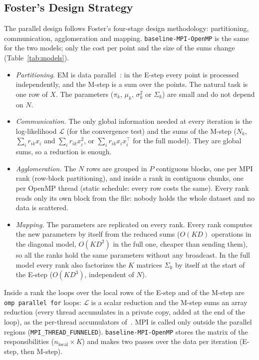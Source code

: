 \documentclass[conference,onecolumn]{IEEEtran}
\newcommand{\vbase}{\texttt{baseline-\allowbreak MPI-\allowbreak OpenMP}}
\begin{document}
\subsection{Foster's Design Strategy}
The parallel design follows Foster's four-stage design methodology: partitioning, communication, agglomeration and mapping. \vbase{} is the same for the two models; only the cost per point and the size of the sums change (Table~\ref{tab:models}).
\begin{itemize}
\item \emph{Partitioning.} EM is data parallel~\cite{sanderson,lee2020,kwedlo}: in the E-step every point is processed independently, and the M-step is a sum over the points. The natural task is one row of $X$. The parameters ($\pi_k$, $\mu_k$, $\sigma^2_k$ or $\Sigma_k$) are small and do not depend on $N$.
\item \emph{Communication.} The only global information needed at every iteration is the log-likelihood $\mathcal{L}$ (for the convergence test) and the sums of the M-step ($N_k$, $\sum_i r_{ik}x_i$ and $\sum_i r_{ik}x_i^2$, or $\sum_i r_{ik}x_ix_i^\top$ for the full model). They are global sums, so a reduction is enough.
\item \emph{Agglomeration.} The $N$ rows are grouped in $P$ contiguous blocks, one per MPI rank (row-block partitioning), and inside a rank in contiguous chunks, one per OpenMP thread (static schedule: every row costs the same). Every rank reads only its own block from the file: nobody holds the whole dataset and no data is scattered.
\item \emph{Mapping.} The parameters are replicated on every rank. Every rank computes the new parameters by itself from the reduced sums ($O(KD)$ operations in the diagonal model, $O(KD^2)$ in the full one, cheaper than sending them), so all the ranks hold the same parameters without any broadcast. In the full model every rank also factorizes the $K$ matrices $\Sigma_k$ by itself at the start of the E-step ($O(KD^3)$, independent of $N$).
\end{itemize}

Inside a rank the loops over the local rows of the E-step and of the M-step are \texttt{omp parallel for} loops: $\mathcal{L}$ is a scalar reduction and the M-step sums an array reduction (every thread accumulates in a private copy, added at the end of the loop), as the per-thread accumulators of~\cite[Eq.~(9)--(14)]{sanderson}. MPI is called only outside the parallel regions (\texttt{MPI\_THREAD\_FUNNELED}). \vbase{} stores the matrix of the responsibilities ($n_{\mathrm{local}}\times K$) and makes two passes over the data per iteration (E-step, then M-step).
\end{document}

